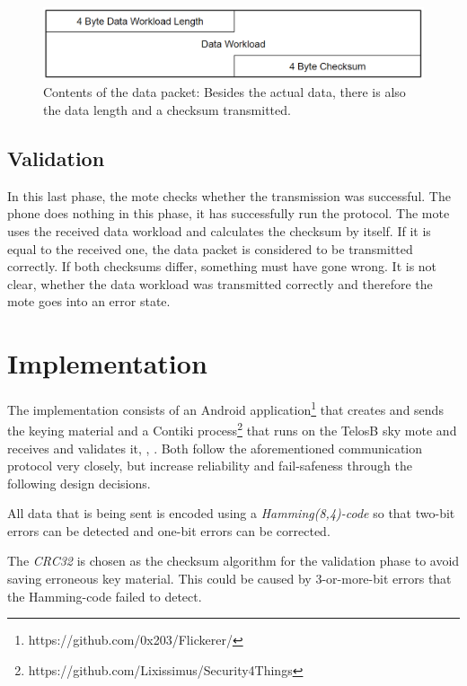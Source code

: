 \documentclass{sig-alternate} %
\begin{document}
\begin{figure}
	\centering
	\includegraphics[scale=.3]{images/data_packet.png}
	\caption{Contents of the data packet: Besides the actual data, there is also the data length and a checksum transmitted.}
	\label{fig:data_packet}
\end{figure}

\subsection{Validation}
\label{sub:validation}

In this last phase, the mote checks whether the transmission was successful.
The phone does nothing in this phase, it has successfully run the protocol.
The mote uses the received data workload and calculates the checksum by itself.
If it is equal to the received one, the data packet is considered to be transmitted correctly.
If both checksums differ, something must have gone wrong.
It is not clear, whether the data workload was transmitted correctly and therefore the mote goes into an error state.

\section{Implementation}
\label{sec:implementation}

The implementation consists of an Android application\footnote{https://github.com/0x203/Flickerer/} that creates and sends the keying material and a Contiki process\footnote{https://github.com/Lixissimus/Security4Things} that runs on the TelosB sky mote and receives and validates it, \cite{dunkels04contiki}, \cite{telosb}.
Both follow the aforementioned communication protocol very closely, but increase reliability and fail-safeness through the following design decisions.

All data that is being sent is encoded using a \textit{Hamming(8,4)-code} so that two-bit errors can be detected and one-bit errors can be corrected.

The \textit{CRC32} is chosen as the checksum algorithm for the validation phase to avoid saving erroneous key material.
This could be caused by 3-or-more-bit errors that the Hamming-code failed to detect.
\end{document}
